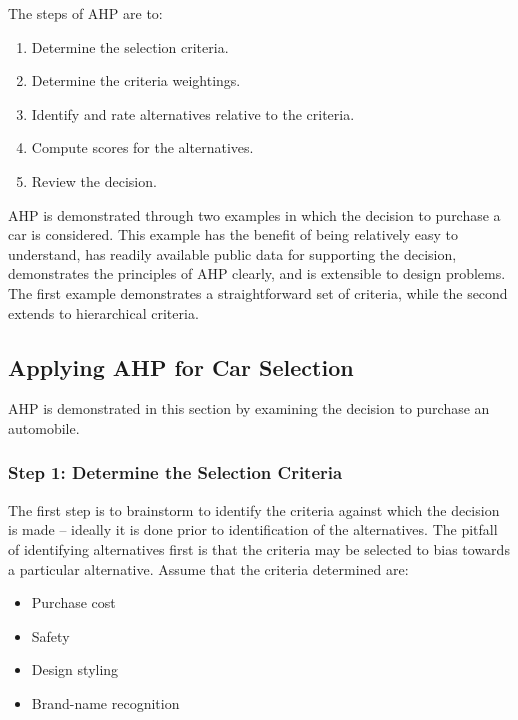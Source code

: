 The steps of AHP are to:

\begin{enumerate}
\def\labelenumi{\arabic{enumi}.}
\item
  Determine the selection criteria.
\item
  Determine the criteria weightings.
\item
  Identify and rate alternatives relative to the criteria.
\item
  Compute scores for the alternatives.
\item
  Review the decision.
\end{enumerate}

AHP is demonstrated through two examples in which the decision to
purchase a car is considered. This example has the benefit of being
relatively easy to understand, has readily available public data for
supporting the decision, demonstrates the principles of AHP clearly, and
is extensible to design problems. The first example demonstrates a
straightforward set of criteria, while the second extends to
hierarchical criteria.

\subsection{Applying AHP for Car
Selection}\label{applying-ahp-for-car-selection}

AHP is demonstrated in this section by examining the decision to
purchase an automobile.

\subsubsection*{Step 1: Determine the Selection
Criteria}\label{step-1-determine-the-selection-criteria}

The first step is to brainstorm to identify the criteria against which
the decision is made -- ideally it is done prior to identification of
the alternatives. The pitfall of identifying alternatives first is that
the criteria may be selected to bias towards a particular alternative.
Assume that the criteria determined are:

\begin{itemize}
\item
  Purchase cost
\item
  Safety
\item
  Design styling
\item
  Brand-name recognition
\end{itemize}


